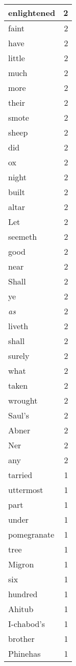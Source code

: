 \begin{center}
\begin{longtable}{l|r}
enlightened & 2 \\ \hline
faint & 2 \\ \hline
have & 2 \\ \hline
little & 2 \\ \hline
much & 2 \\ \hline
more & 2 \\ \hline
their & 2 \\ \hline
smote & 2 \\ \hline
sheep & 2 \\ \hline
did & 2 \\ \hline
ox & 2 \\ \hline
night & 2 \\ \hline
built & 2 \\ \hline
altar & 2 \\ \hline
Let & 2 \\ \hline
seemeth & 2 \\ \hline
good & 2 \\ \hline
near & 2 \\ \hline
Shall & 2 \\ \hline
ye & 2 \\ \hline
\emph{as} & 2 \\ \hline
liveth & 2 \\ \hline
shall & 2 \\ \hline
surely & 2 \\ \hline
what & 2 \\ \hline
taken & 2 \\ \hline
wrought & 2 \\ \hline
Saul's & 2 \\ \hline
Abner & 2 \\ \hline
Ner & 2 \\ \hline
any & 2 \\ \hline
tarried & 1 \\ \hline
uttermost & 1 \\ \hline
part & 1 \\ \hline
under & 1 \\ \hline
pomegranate & 1 \\ \hline
tree & 1 \\ \hline
Migron & 1 \\ \hline
six & 1 \\ \hline
hundred & 1 \\ \hline
Ahitub & 1 \\ \hline
I-chabod's & 1 \\ \hline
brother & 1 \\ \hline
Phinehas & 1 \\ \hline

\end{longtable}
\end{center}
